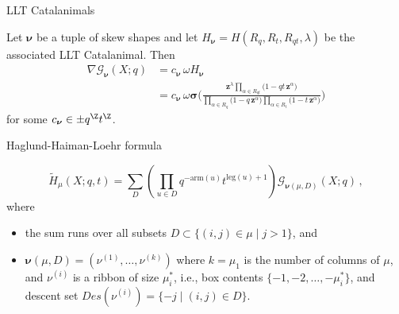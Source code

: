 \documentclass[dvipsnames]{beamer}
\newcommand{\zz}{{\boldsymbol z}}
\newcommand{\sigmabold}{\boldsymbol \sigma}
\newcommand{\Htild}{\tilde{H}}
\newcommand{\Gcal}{{\mathcal G}}
\newcommand{\nubold}{{\boldsymbol \nu }}
\newcommand{\leg}{{\mathrm{leg}}}
\newcommand{\arm}{{\mathrm{arm}}}
\theoremstyle{definition}
\begin{document}
\begin{frame}{LLT Catalanimals}
\begin{theorem}
Let  $\nubold$ be a tuple of skew shapes 
and let $H_{\nubold} = H(R_q,R_t,R_{qt}, \lambda)$ be the associated LLT Catalanimal. Then
 \vspace{-2mm}
\begin{align*}
\nabla \Gcal_{\nubold}(X;q)
& = c_\nubold\,\omega H_{\nubold}
\\
& = c_\nubold  \, \omega \sigmabold
 \bigg(\frac{\zz ^\lambda \prod_{\alpha \in
R_{qt}} \big(1-q t\, \zz ^\alpha \big)} {\prod_{\alpha \in R_q} \big(1-q \, \zz ^\alpha\big)
\prod_{\alpha \in R_t} \big(1-t \, \zz ^\alpha\big)}\bigg)
\end{align*}
for some $c_\nubold \in \pm q^\Z t^{\Z}$.
\end{theorem}
\end{frame}
\begin{frame}{Haglund-Haiman-Loehr formula}
  \begin{theorem}
    \[
      \Htild_\mu(X;q,t) = \sum_D \left( \prod_{u \in D} q^{-\arm(u)}
        t^{\leg(u)+1}\right) \Gcal_{\nubold(\mu,D)}(X;q)\,,
    \]
    where
    \begin{itemize}
    \item the sum runs over all subsets
      \(D \subset \{(i,j) \in \mu \mid j > 1\}\), and
    \item \(\nubold(\mu,D) = (\nu^{(1)}, \ldots, \nu^{(k)})\) where
      \(k=\mu_1\) is the number of columns of \(\mu\), and
      \(\nu^{(i)}\) is a ribbon of size \(\mu_i^*\), i.e., box contents
      \(\{-1,-2,\ldots,-\mu_i^*\}\), and descent set
      \(Des(\nu^{(i)}) = \{-j \mid (i,j) \in D\}\).
    \end{itemize}
  \end{theorem}
\end{frame}
\end{document}
